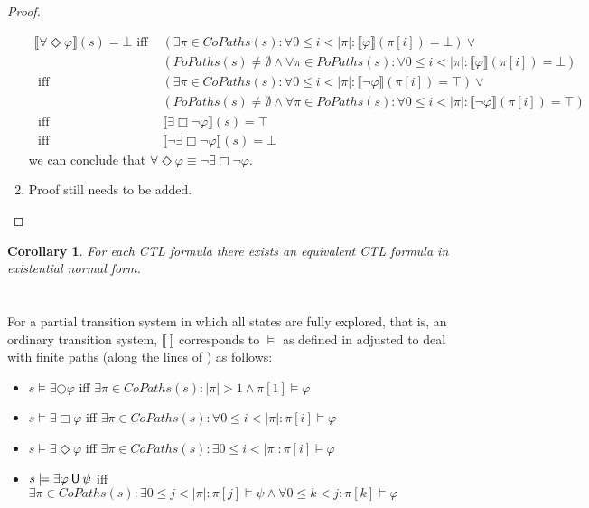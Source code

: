 \documentclass[12pt]{article}
\newcommand{\always}{\Box}
\newcommand{\eventually}{\Diamond}
\newcommand{\nxt}{\bigcirc}
\newcommand{\until}{\mathbin{\sf U}}
\newtheorem{corollary}{Corollary}
\theoremstyle{definition}
\newcommand{\satisfaction}[1]{\llbracket #1 \rrbracket}
\newcommand{\bottom}{\mathord{\perp}}
\newenvironment{franck}{\color{red}}{\color{black}}
\begin{document}
\begin{proof}
\begin{enumerate}
\begin{align*}
\satisfaction{\forall \eventually \varphi}(s) = \bottom
\mbox{ iff } & (\exists \pi \in \mathit{CoPaths}(s) : \forall 0 \leq i < |\pi| : \satisfaction{\varphi}(\pi[i]) = \bottom) \vee\\
& (\mathit{PoPaths}(s) \not= \emptyset \wedge \forall \pi \in \mathit{PoPaths}(s) : \forall 0 \leq i < |\pi| : \satisfaction{\varphi}(\pi[i]) = \bottom)\\
\mbox{ iff } & (\exists \pi \in \mathit{CoPaths}(s) : \forall 0 \leq i < |\pi| : \satisfaction{\neg \varphi}(\pi[i]) = \top) \vee\\
& (\mathit{PoPaths}(s) \not= \emptyset \wedge \forall \pi \in \mathit{PoPaths}(s) : \forall 0 \leq i < |\pi| : \satisfaction{\neg \varphi}(\pi[i]) = \top)\\
\mbox{ iff } & \satisfaction{\exists \always \neg \varphi}(s) = \top\\
\mbox{ iff } & \satisfaction{\neg \exists \always \neg \varphi}(s) = \bottom
\end{align*}
we can conclude that $\forall \eventually \varphi \equiv \neg \exists \always \neg \varphi$.
\item
\begin{franck}
Proof still needs to be added.
\end{franck}
\end{enumerate}
\end{proof}

\begin{corollary}
For each CTL formula there exists an equivalent CTL formula in existential normal form.
\end{corollary}

\section{}

For a partial transition system in which all states are fully explored, that is, an ordinary transition system, $\satisfaction{\ }$ corresponds to $\models$ as defined in \cite[Definition~6.4]{BK08} adjusted to deal with finite paths (along the lines of \cite{GV13}) as follows:
\begin{itemize}
\item 
$s \models \exists \nxt \varphi$ iff $\exists \pi \in \mathit{CoPaths}(s): |\pi| > 1 \wedge \pi[1] \models \varphi$ 
\item
$s \models \exists \always \varphi$ iff $\exists \pi \in \mathit{CoPaths}(s) : \forall 0 \leq i < |\pi| : \pi[i] \models \varphi$
\item
$s \models \exists \eventually \varphi$ iff $\exists \pi \in \mathit{CoPaths}(s) : \exists 0 \leq i < |\pi| : \pi[i] \models \varphi$
\item
$s \models \exists \varphi \until \psi$ iff $\exists \pi \in \mathit{CoPaths}(s) : \exists 0 \leq j < |\pi| : \pi[j] \models \psi \wedge \forall 0 \leq k < j : \pi[k] \models \varphi$
\end{itemize}
\end{document}
